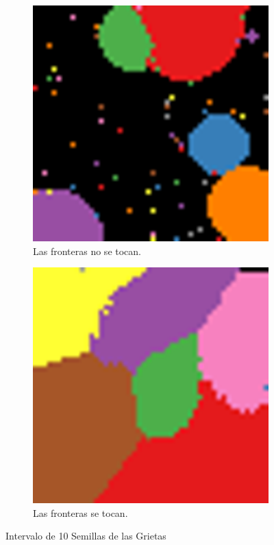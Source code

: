 \documentclass{article}
\begin{document}
\begin{figure}
     \centering
     \begin{subfigure}[b]{0.40\textwidth}
         \centering
         \includegraphics[width=\textwidth]{ciclo_11.png}
         \caption{Las fronteras no se tocan.}
         \label{fig:notocan}
     \end{subfigure}
     \begin{subfigure}[b]{0.40\textwidth}
         \centering
         \includegraphics[width=\textwidth]{ciclo_33.png}
         \caption{Las fronteras se tocan.}
         \label{fig:tocan}
     \end{subfigure}
     \caption{Intervalo de 10 Semillas de las Grietas}
      \label{semilla}
\end{figure}
\end{document}
